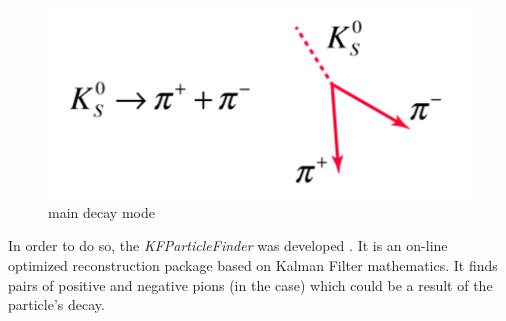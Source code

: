 \begin{figure}[H]
\centering
    \includegraphics[width=.4\textwidth]{img/kdecay1.png}
    \caption{\PKshort main decay mode \cite{kdecay1}}
    \label{ks decay}
\end{figure}

In order to do so, the \emph{KFParticleFinder} was developed \cite{kfp}. It is an on-line optimized reconstruction package based on Kalman Filter mathematics. It finds pairs of positive and negative pions (in the \PKShort case) which could be a result of the particle's decay.
